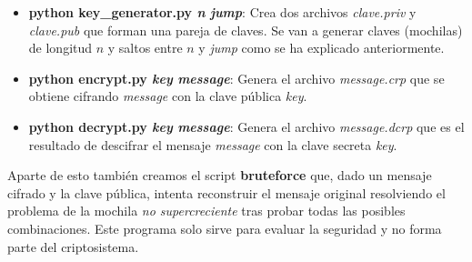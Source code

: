 \documentclass[12pt]{article}
\begin{document}
\begin{itemize}
	\item \textbf{python key\_generator.py \textit{n} \textit{jump}}: Crea dos archivos \textit{clave.priv} y \textit{clave.pub} que forman una pareja de claves. Se van a generar claves (mochilas) de longitud $n$ y saltos entre $n$ y \textit{jump} como se ha explicado anteriormente.
	\item \textbf{python encrypt.py \textit{key} \textit{message}}: Genera el archivo \textit{message.crp} que se obtiene cifrando \textit{message} con la clave pública \textit{key}.
	\item \textbf{python decrypt.py \textit{key} \textit{message}}: Genera el archivo \textit{message.dcrp} que es el resultado de descifrar el mensaje \textit{message} con la clave secreta \textit{key}.
\end{itemize}
Aparte de esto también creamos el script \textbf{bruteforce} que, dado un mensaje cifrado y la clave pública, intenta reconstruir el mensaje original resolviendo el problema de la mochila \emph{no supercreciente} tras probar todas las posibles combinaciones. Este programa solo sirve para evaluar la seguridad y no forma parte del criptosistema.





 
\end{document}
